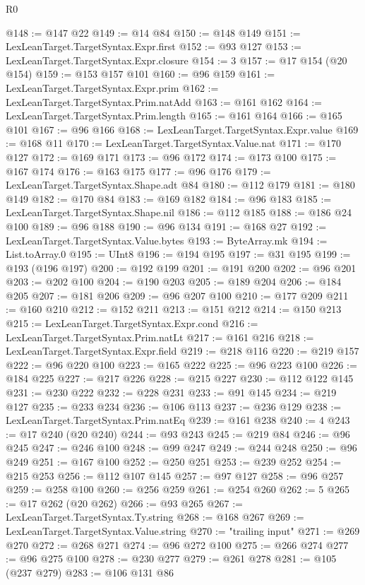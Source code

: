 \begin{lexlean}{R0}
\begin{coremodule}
@148 := @147 @22
@149 := @14 @84
@150 := @148 @149
@151 := LexLeanTarget.TargetSyntax.Expr.first
@152 := @93 @127
@153 := LexLeanTarget.TargetSyntax.Expr.closure
@154 := 3
@157 := @17 @154 (@20 @154)
@159 := @153 @157 @101
@160 := @96 @159
@161 := LexLeanTarget.TargetSyntax.Expr.prim
@162 := LexLeanTarget.TargetSyntax.Prim.natAdd
@163 := @161 @162
@164 := LexLeanTarget.TargetSyntax.Prim.length
@165 := @161 @164
@166 := @165 @101
@167 := @96 @166
@168 := LexLeanTarget.TargetSyntax.Expr.value
@169 := @168 @11
@170 := LexLeanTarget.TargetSyntax.Value.nat
@171 := @170 @127
@172 := @169 @171
@173 := @96 @172
@174 := @173 @100
@175 := @167 @174
@176 := @163 @175
@177 := @96 @176
@179 := LexLeanTarget.TargetSyntax.Shape.adt @84
@180 := @112 @179
@181 := @180 @149
@182 := @170 @84
@183 := @169 @182
@184 := @96 @183
@185 := LexLeanTarget.TargetSyntax.Shape.nil
@186 := @112 @185
@188 := @186 @24 @100
@189 := @96 @188
@190 := @96 @134
@191 := @168 @27
@192 := LexLeanTarget.TargetSyntax.Value.bytes
@193 := ByteArray.mk
@194 := List.toArray.{0}
@195 := UInt8
@196 := @194 @195
@197 := @31 @195
@199 := @193 (@196 @197)
@200 := @192 @199
@201 := @191 @200
@202 := @96 @201
@203 := @202 @100
@204 := @190 @203
@205 := @189 @204
@206 := @184 @205
@207 := @181 @206
@209 := @96 @207 @100
@210 := @177 @209
@211 := @160 @210
@212 := @152 @211
@213 := @151 @212
@214 := @150 @213
@215 := LexLeanTarget.TargetSyntax.Expr.cond
@216 := LexLeanTarget.TargetSyntax.Prim.natLt
@217 := @161 @216
@218 := LexLeanTarget.TargetSyntax.Expr.field
@219 := @218 @116
@220 := @219 @157
@222 := @96 @220 @100
@223 := @165 @222
@225 := @96 @223 @100
@226 := @184 @225
@227 := @217 @226
@228 := @215 @227
@230 := @112 @122 @145
@231 := @230 @222
@232 := @228 @231
@233 := @91 @145
@234 := @219 @127
@235 := @233 @234
@236 := @106 @113
@237 := @236 @129
@238 := LexLeanTarget.TargetSyntax.Prim.natEq
@239 := @161 @238
@240 := 4
@243 := @17 @240 (@20 @240)
@244 := @93 @243
@245 := @219 @84
@246 := @96 @245
@247 := @246 @100
@248 := @99 @247
@249 := @244 @248
@250 := @96 @249
@251 := @167 @100
@252 := @250 @251
@253 := @239 @252
@254 := @215 @253
@256 := @112 @107 @145
@257 := @97 @127
@258 := @96 @257
@259 := @258 @100
@260 := @256 @259
@261 := @254 @260
@262 := 5
@265 := @17 @262 (@20 @262)
@266 := @93 @265
@267 := LexLeanTarget.TargetSyntax.Ty.string
@268 := @168 @267
@269 := LexLeanTarget.TargetSyntax.Value.string
@270 := "trailing input"
@271 := @269 @270
@272 := @268 @271
@274 := @96 @272 @100
@275 := @266 @274
@277 := @96 @275 @100
@278 := @230 @277
@279 := @261 @278
@281 := @105 (@237 @279)
@283 := @106 @131 @86

\end{coremodule}
\end{lexlean}
